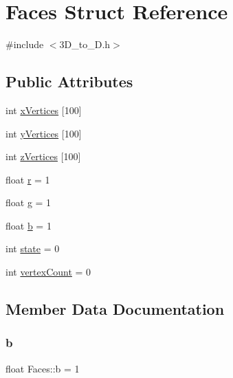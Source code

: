 \hypertarget{struct_faces}{}\section{Faces Struct Reference}
\label{struct_faces}


{\ttfamily \#include $<$3\+D\+\_\+to\+\_\+D.\+h$>$}

\subsection*{Public Attributes}
\begin{DoxyCompactItemize}
\item 
int \mbox{\hyperlink{struct_faces_a10f7db63902c732671722acceb3bb5fc}{x\+Vertices}} \mbox{[}100\mbox{]}
\item 
int \mbox{\hyperlink{struct_faces_a1024fd16ccad80cb60731f823ec8d93d}{y\+Vertices}} \mbox{[}100\mbox{]}
\item 
int \mbox{\hyperlink{struct_faces_a3116e7f7b2bc3d5487f84adc34c7c44e}{z\+Vertices}} \mbox{[}100\mbox{]}
\item 
float \mbox{\hyperlink{struct_faces_a07f55b8f6db2f1302127e6688d046db3}{r}} = 1
\item 
float \mbox{\hyperlink{struct_faces_a3eaaf8e841066b6a941c657236fdf78b}{g}} = 1
\item 
float \mbox{\hyperlink{struct_faces_a02e5d85a1539b313e832f69648c36b11}{b}} = 1
\item 
int \mbox{\hyperlink{struct_faces_adaf05abb8ca99419e89873072a016e0c}{state}} = 0
\item 
int \mbox{\hyperlink{struct_faces_aac7ccdc42ded2ed834f9280f07789f81}{vertex\+Count}} = 0
\end{DoxyCompactItemize}


\subsection{Member Data Documentation}
\mbox{\label{struct_faces_a02e5d85a1539b313e832f69648c36b11}} 
\subsubsection{\texorpdfstring{b}{b}}
{\footnotesize\ttfamily float Faces\+::b = 1}

\mbox{\label{struct_faces_a3eaaf8e841066b6a941c657236fdf78b}} 
